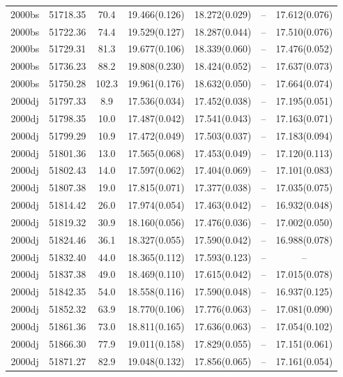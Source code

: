\begin{table*}
\begin{tabular}{ccccccc}
2000bs	  & 51718.35	 & 70.4	& 19.466(0.126)	 & 18.272(0.029)	 & --	 & 17.612(0.076) \\ 
2000bs	  & 51722.36	 & 74.4	& 19.529(0.127)	 & 18.287(0.044)	 & --	 & 17.510(0.076) \\ 
2000bs	  & 51729.31	 & 81.3	& 19.677(0.106)	 & 18.339(0.060)	 & --	 & 17.476(0.052) \\ 
2000bs	  & 51736.23	 & 88.2	& 19.808(0.230)	 & 18.424(0.052)	 & --	 & 17.637(0.073) \\ 
2000bs	  & 51750.28	 & 102.3	& 19.961(0.176)	 & 18.632(0.050)	 & --	 & 17.664(0.074) \\ 
2000dj	  & 51797.33	 & 8.9	& 17.536(0.034)	 & 17.452(0.038)	 & --	 & 17.195(0.051) \\ 
2000dj	  & 51798.35	 & 10.0	& 17.487(0.042)	 & 17.541(0.043)	 & --	 & 17.163(0.071) \\ 
2000dj	  & 51799.29	 & 10.9	& 17.472(0.049)	 & 17.503(0.037)	 & --	 & 17.183(0.094) \\ 
2000dj	  & 51801.36	 & 13.0	& 17.565(0.068)	 & 17.453(0.049)	 & --	 & 17.120(0.113) \\ 
2000dj	  & 51802.43	 & 14.0	& 17.597(0.062)	 & 17.404(0.069)	 & --	 & 17.101(0.083) \\ 
2000dj	  & 51807.38	 & 19.0	& 17.815(0.071)	 & 17.377(0.038)	 & --	 & 17.035(0.075) \\ 
2000dj	  & 51814.42	 & 26.0	& 17.974(0.054)	 & 17.463(0.042)	 & --	 & 16.932(0.048) \\ 
2000dj	  & 51819.32	 & 30.9	& 18.160(0.056)	 & 17.476(0.036)	 & --	 & 17.002(0.050) \\ 
2000dj	  & 51824.46	 & 36.1	& 18.327(0.055)	 & 17.590(0.042)	 & --	 & 16.988(0.078) \\ 
2000dj	  & 51832.40	 & 44.0	& 18.365(0.112)	 & 17.593(0.123)	 & --	 & -- \\ 
2000dj	  & 51837.38	 & 49.0	& 18.469(0.110)	 & 17.615(0.042)	 & --	 & 17.015(0.078) \\ 
2000dj	  & 51842.35	 & 54.0	& 18.558(0.116)	 & 17.590(0.048)	 & --	 & 16.937(0.125) \\ 
2000dj	  & 51852.32	 & 63.9	& 18.770(0.106)	 & 17.776(0.063)	 & --	 & 17.081(0.090) \\ 
2000dj	  & 51861.36	 & 73.0	& 18.811(0.165)	 & 17.636(0.063)	 & --	 & 17.054(0.102) \\ 
2000dj	  & 51866.30	 & 77.9	& 19.011(0.158)	 & 17.829(0.055)	 & --	 & 17.151(0.061) \\ 
2000dj	  & 51871.27	 & 82.9	& 19.048(0.132)	 & 17.856(0.065)	 & --	 & 17.161(0.054) \\ 

\end{tabular}
\end{table*}
